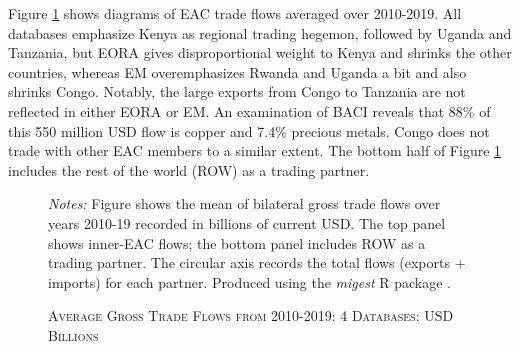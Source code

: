 \documentclass[a4paper]{article}
\begin{document}
Figure \ref{fig:MIG} shows diagrams of EAC trade flows averaged over 2010-2019. All databases emphasize Kenya as regional trading hegemon, followed by Uganda and Tanzania, but EORA gives disproportional weight to Kenya and shrinks the other countries, whereas EM overemphasizes Rwanda and Uganda a bit and also shrinks Congo. Notably, the large exports from Congo to Tanzania are not reflected in either EORA or EM. An examination of BACI reveals that 88\% of this 550 million USD flow is copper and 7.4\% precious metals. Congo does not trade with other EAC members to a similar extent. The bottom half of Figure \ref{fig:MIG} includes the rest of the world (ROW) as a trading partner. 

\begin{figure}[h!] \vspace{-2mm}
\centering
\centering
\caption{\label{fig:MIG}\textsc{Average Gross Trade Flows from 2010-2019: 4 Databases: USD Billions}}
\vspace{2mm}
\raggedright
\scriptsize 
\emph{Notes:} Figure shows the mean of bilateral gross trade flows over years 2010-19 recorded in billions of current USD. The top panel shows inner-EAC flows; the bottom panel includes ROW as a trading partner. The circular axis records the total flows (exports + imports) for each partner. Produced using the \emph{migest} R package \citep{rmigest}.
\end{figure}
\FloatBarrier
\end{document}
